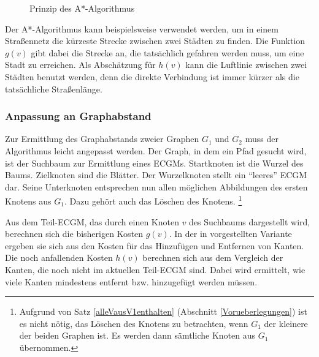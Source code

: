 
\begin{figure}[htb]
\vspace*{0.5cm}
\centering
{}
\caption{Prinzip des A*-Algorithmus}
\label{pic:AStern}
\end{figure}


Der A*-Algorithmus kann beispielsweise verwendet werden, um in einem Straßennetz die 
kürzeste Strecke zwischen zwei Städten zu finden. Die Funktion $g(v)$ gibt dabei die 
Strecke an, die tatsächlich gefahren werden muss, um eine Stadt zu erreichen. Als 
Abschätzung für $h(v)$ kann die Luftlinie zwischen zwei Städten benutzt werden, denn 
die direkte Verbindung ist immer kürzer als die tatsächliche Straßenlänge. 

\subsubsection{Anpassung an Graphabstand}
Zur Ermittlung des Graphabstands zweier Graphen $G_1$ und $G_2$ muss der 
Algorithmus leicht angepasst werden. Der Graph, in dem ein Pfad gesucht 
wird, ist der Suchbaum zur Ermittlung eines ECGMs. 
Startknoten ist die Wurzel des Baums. Zielknoten sind die Blätter. Der Wurzelknoten 
stellt ein "`leeres"' ECGM dar. Seine Unterknoten entsprechen nun allen möglichen 
Abbildungen des ersten Knotens aus $G_1$. Dazu gehört auch das Löschen des 
Knotens. \footnote{Aufgrund von Satz \ref{alleVausV1enthalten} (Abschnitt 
\ref{Vorueberlegungen}) ist es nicht nötig, das Löschen des Knotens zu betrachten, wenn 
$G_1$ der kleinere der beiden Graphen ist. Es werden dann sämtliche Knoten aus $G_1$ 
übernommen.} 

Aus dem Teil-ECGM, das durch einen Knoten $v$ des Suchbaums 
dargestellt wird, berechnen sich die bisherigen Kosten $g(v)$. 
In der in \cite{phdRiesen} vorgestellten Variante  ergeben sie 
sich aus den Kosten für das Hinzufügen und Entfernen von Kanten. Die noch anfallenden 
Kosten $h(v)$ berechnen sich aus dem Vergleich der Kanten, die noch nicht im aktuellen 
Teil-ECGM sind. Dabei wird ermittelt, wie viele Kanten mindestens entfernt bzw. hinzugefügt
werden müssen.

